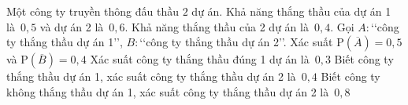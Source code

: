 \begin{ex}%
	Một công ty truyền thông đấu thầu $2$ dự án. Khả năng thắng thầu của dự án 1 là~$0{,}5$ và dự án 2 là~$0{,}6$. Khả năng thắng thầu của 2  dự án là~$0{,}4$. Gọi $A\colon $\lq\lq công ty thắng thầu dự án 1\rq\rq, $B\colon $\lq\lq công ty thắng thầu dự án 2\rq\rq.
	 \choiceTF
		{\True  Xác suất $\mathrm{P}(\overline{A})=0{,}5$ và $\mathrm{P}(\overline{B})=0{,}4$}
		{\True Xác  suất công ty thắng thầu đúng 1 dự án là~$0{,}3$}
		{Biết công ty thắng thầu  dự án 1, xác suất công ty thắng thầu dự án 2 là~$0{,}4$}
		{Biết công ty không thắng thầu dự án 1,  xác suất công ty thắng thầu dự án 2 là~$0{,}8$}
\end{ex}

